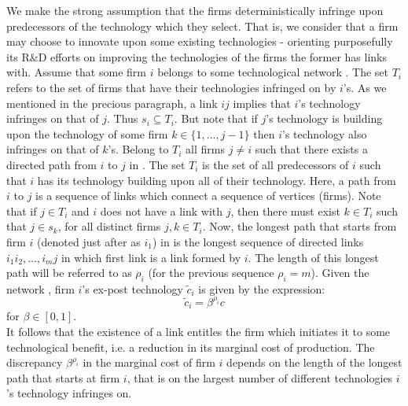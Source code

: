 \documentclass{article}
\begin{document}
\indent We make the strong assumption that the firms deterministically infringe upon predecessors of the technology which they select. That is, we consider that a firm may choose to innovate upon some existing technologies - orienting purposefully its R\&D efforts on improving the technologies of the firms the former has links with. Assume that some firm $i$ belongs to some technological network . The set $T_i$ refers to the set of firms that have their technologies infringed on by $i$'s. As we mentioned in the precious paragraph, a link $ij$ implies that $i$'s technology infringes on that of $j$. Thus $s_i\subseteq T_i$. But note that if $j$'s technology is building upon the technology of some firm $k\in \{1,\ldots,j-1\}$ then $i$'s technology also infringes on that of $k$'s. Belong to $T_i$ all firms $j\neq i$ such that there exists a directed path from $i$ to $j$ in . The set $T_i$ is the set of all predecessors of $i$ such that $i$ has its technology building upon all of their technology. Here, a path from $i$ to $j$ is a sequence of links which connect a sequence of vertices (firms). Note that if $j\in T_i$ and $i$ does not have a link with $j$, then there must exist $k\in T_i$ such that $j\in s_k$, for all distinct firms $j,k\in T_i$. Now, the longest path that starts from firm $i$ (denoted just after as $i_1$) in  is the longest sequence of directed links $ i_1i_2,\ldots , i_mj$ in  which first link is a link formed by $i$. The length of this longest path will be referred to as $\rho_i$ (for the previous sequence $\rho_i=m$). Given the network , firm $i$'s ex-post technology $\tilde{c}_i$ is given by the expression:
\begin{equation}
\tilde{c}_i=\beta^{\rho_i}c
\end{equation}
for $\beta \in [0,1]$. \\
\indent It follows that the existence of a link entitles the firm which initiates it to some technological benefit, i.e. a reduction in its marginal cost of production. The discrepancy $\beta^{\rho_i}$ in the marginal cost of firm $i$ depends on the length of the longest path that starts at firm $i$, that is on the largest number of different technologies $i$'s technology infringes on.\\
\end{document}
